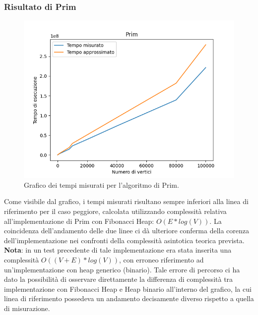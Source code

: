 \subsubsection{Risultato di Prim}
\begin{figure}[H]
	\centering
	\includegraphics[width=1\linewidth]{"../graphs/prim"}
	\caption[]{Grafico dei tempi misurati per l'algoritmo di Prim.}
	\label{fig:prim-graph}
\end{figure}
Come visibile dal grafico, i tempi misurati risultano sempre inferiori alla linea di riferimento per il caso peggiore, calcolata utilizzando complessità relativa all'implementazione di Prim con Fibonacci Heap: $O(E*log(V))$. La coincidenza dell'andamento delle due linee ci dà ulteriore conferma della corenza dell'implementazione nei confronti della complessità asintotica teorica prevista. \\

\textbf{Nota}: in un test precedente di tale implementazione era stata inserita una complessità $O((V + E)*log(V))$, con erroneo riferimento ad un'implementazione con heap generico (binario). Tale errore di percorso ci ha dato la possibilità di osservare direttamente la differenza di complessità tra implementazione con Fibonacci Heap e Heap binario all'interno del grafico, la cui linea di riferimento possedeva un andamento decisamente diverso rispetto a quella di misurazione.

